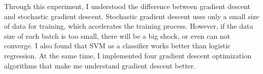 \documentclass[journal, a4paper]{IEEEtran}
\begin{document}
    Through this experiment, I understood the difference between gradient descent and stochastic gradient descent. Stochastic gradient descent uses only a small size of data for training, which accelerates the training process. However, if the data size of each batch is too small, there will be a big shock, or even can not converge.
    I also found that SVM as a classifier works better than logistic regression.
    At the same time, I implemented four gradient descent optimization algorithms that make me understand gradient descent better.


\end{document}
